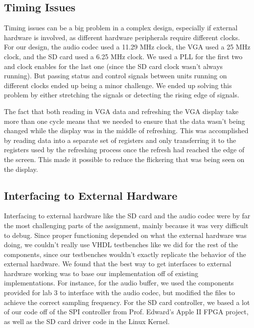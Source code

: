 \documentclass{article}
\begin{document}
\subsection{Timing Issues}

Timing issues can be a big problem in a complex design, especially if external 
hardware is involved, as different hardware peripherals require different clocks. 
For our design, the audio codec used a 11.29 MHz clock, the VGA used a 25 MHz 
clock, and the SD card used a 6.25 MHz clock. We used a PLL for the first two 
and clock enables for the last one (since the SD card clock wasn't always running). 
But passing status and control signals between units running on different clocks 
ended up being a minor challenge. We ended up solving this problem by either 
stretching the signals or detecting the rising edge of signals.

The fact that both reading in VGA data and refreshing the VGA display take more 
than one cycle means that we needed to ensure that the data wasn't being changed 
while the display was in the middle of refreshing. This was accomplished by 
reading data into a separate set of registers and only transferring it to the 
registers used by the refreshing process once the refresh had reached the edge 
of the screen.  This made it possible to reduce the flickering that was being 
seen on the display.

\subsection{Interfacing to External Hardware}

Interfacing to external hardware like the SD card and the audio codec were by 
far the most challenging parts of the assignment, mainly because it was very 
difficult to debug. Since proper functioning depended on what the external 
hardware was doing, we couldn't really use VHDL testbenches like we did for 
the rest of the components, since our testbenches wouldn't exactly replicate 
the behavior of the external hardware. We found that the best way to get 
interfaces to external hardware working was to base our implementation off of 
existing implementations. For instance, for the audio buffer, we used the 
components provided for lab 3 to interface with the audio codec, but modified 
the files to achieve the correct sampling frequency. For the SD card controller, 
we based a lot of our code off of the SPI controller from Prof. Edward's Apple 
II FPGA project, as well as the SD card driver code in the Linux Kernel. 
\end{document}
